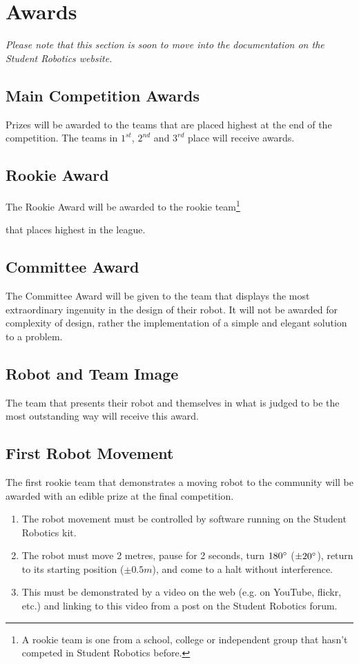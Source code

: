 \section {Awards}
\label{sec:Awards}

\textit{Please note that this section is soon to move into the documentation on the Student Robotics website.}

\subsection{Main Competition Awards}
Prizes will be awarded to the teams that are placed highest at the end of the competition.
The teams in $1^{st}$, $2^{nd}$ and $3^{rd}$ place will receive awards.

\subsection{Rookie Award}
The Rookie Award will be awarded to the rookie
team\footnote{A rookie team is one from a school, college or independent group that hasn't competed in Student Robotics before.}\addtocounter{footnote}{-1}\addtocounter{Hfootnote}{-1}
 that places highest in the league.

\subsection{Committee Award}
The Committee Award will be given to the team that displays the most extraordinary ingenuity in the design of their robot.
It will not be awarded for complexity of design, rather the implementation of a simple and elegant solution to a problem.

\subsection{Robot and Team Image}
The team that presents their robot and themselves in what is judged to be the most outstanding way will receive this award.

\subsection{First Robot Movement}
The first rookie team\footnotemark{} that demonstrates a moving robot to the community will be awarded with an edible prize at the final competition.
\begin{enumerate}
\item The robot movement must be controlled by software running on the Student Robotics kit.
\item The robot must move 2 metres, pause for 2 seconds, turn $180\degree$ ($\pm20\degree$), return to its starting position ($\pm0.5m$), and come to a halt without interference.
\item This must be demonstrated by a video on the web (e.g. on YouTube, flickr, etc.) and linking to this video from a post on the Student Robotics forum.
\end{enumerate}

